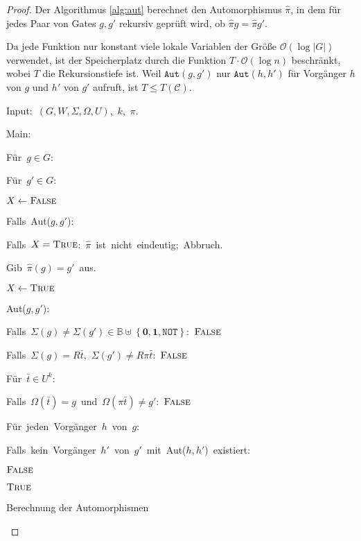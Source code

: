 \begin{proof}
Der Algorithmus \ref{alg:aut} berechnet den Automorphismus $\hat{\pi}$,
in dem für jedes Paar von Gates $g,g'$ rekursiv geprüft wird, ob
$\hat{\pi}g=\hat{\pi}g'$.

Da jede Funktion nur konstant viele lokale Variablen der Größe $\mathcal{O}\left(\log\left|G\right|\right)$
verwendet, ist der Speicherplatz durch die Funktion $T\cdot\mathcal{O}\left(\log n\right)$
beschränkt, wobei $T$ die Rekursionstiefe ist. Weil $\mathtt{Aut}\left(g,g'\right)$
nur $\mathtt{Aut}\left(h,h'\right)$ für Vorgänger $h$ von $g$ und
$h'$ von $g'$ aufruft, ist $T\leqslant T\left(\mathcal{C}\right)$.

\begin{algorithm}
\begin{lyxcode}
Input:~$\left(G,W,\Sigma,\Omega,U\right)$,~$k$,~$\pi$.

Main:~

\begin{lyxcode}
Für~$g\in G$:~

\begin{lyxcode}
Für~$g'\in G$:~

\begin{lyxcode}
$X\leftarrow\textsc{False}$

Falls~Aut($g,g'$):~

\begin{lyxcode}
Falls~$X=\textsc{True}$:~$\hat{\pi}$~ist~nicht~eindeutig;~Abbruch.

Gib~$\hat{\pi}\left(g\right)=g'$~aus.

$X\leftarrow\textsc{True}$
\end{lyxcode}
\end{lyxcode}
\end{lyxcode}
\end{lyxcode}
Aut($g,g'$):~

\begin{lyxcode}
Falls~$\Sigma\left(g\right)\neq\Sigma\left(g'\right)\in\mathbb{B}\uplus\left\{ \mathbf{0},\mathbf{1},\mathtt{NOT}\right\} $:~$\textsc{False}$

Falls~$\Sigma\left(g\right)=R\bar{t}$,~$\Sigma\left(g'\right)\neq R\pi\bar{t}$:~$\textsc{False}$

Für~$\bar{t}\in U^{k}$:~

\begin{lyxcode}
Falls~$\Omega\left(\bar{t}\right)=g$~und~$\Omega\left(\pi\bar{t}\right)\neq g'$:~$\textsc{False}$
\end{lyxcode}
Für~jeden~Vorgänger~$h$~von~$g$:~

\begin{lyxcode}
Falls~kein~Vorgänger~$h'$~von~$g'$~mit~Aut($h,h'$)~existiert:~

\begin{lyxcode}
$\textsc{False}$
\end{lyxcode}
\end{lyxcode}
$\textsc{True}$
\end{lyxcode}
\end{lyxcode}
\caption{\label{alg:aut}Berechnung der Automorphismen}
\end{algorithm}
\end{proof}
